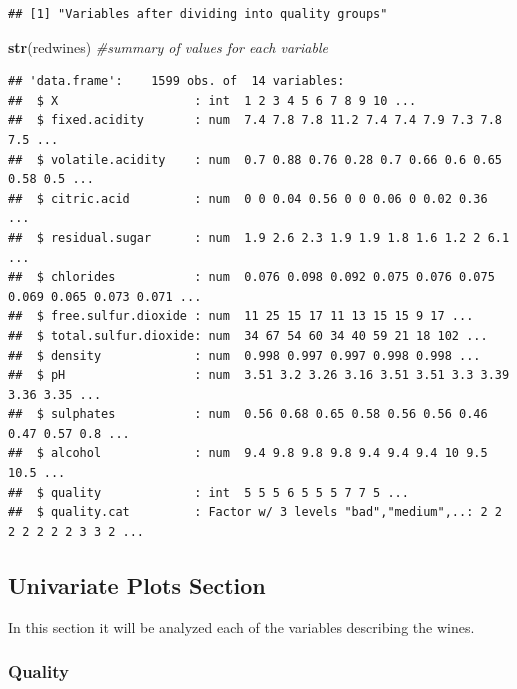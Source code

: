 \documentclass[]{article}
\newenvironment{Shaded}{\begin{snugshade}}{\end{snugshade}}
\newcommand{\KeywordTok}[1]{\textcolor[rgb]{0.13,0.29,0.53}{\textbf{{#1}}}}
\newcommand{\CommentTok}[1]{\textcolor[rgb]{0.56,0.35,0.01}{\textit{{#1}}}}
\newcommand{\NormalTok}[1]{{#1}}
\begin{document}
\begin{verbatim}
## [1] "Variables after dividing into quality groups"
\end{verbatim}

\begin{Shaded}
\begin{Highlighting}[]
\KeywordTok{str}\NormalTok{(redwines) }\CommentTok{#summary of values for each variable}
\end{Highlighting}
\end{Shaded}

\begin{verbatim}
## 'data.frame':    1599 obs. of  14 variables:
##  $ X                   : int  1 2 3 4 5 6 7 8 9 10 ...
##  $ fixed.acidity       : num  7.4 7.8 7.8 11.2 7.4 7.4 7.9 7.3 7.8 7.5 ...
##  $ volatile.acidity    : num  0.7 0.88 0.76 0.28 0.7 0.66 0.6 0.65 0.58 0.5 ...
##  $ citric.acid         : num  0 0 0.04 0.56 0 0 0.06 0 0.02 0.36 ...
##  $ residual.sugar      : num  1.9 2.6 2.3 1.9 1.9 1.8 1.6 1.2 2 6.1 ...
##  $ chlorides           : num  0.076 0.098 0.092 0.075 0.076 0.075 0.069 0.065 0.073 0.071 ...
##  $ free.sulfur.dioxide : num  11 25 15 17 11 13 15 15 9 17 ...
##  $ total.sulfur.dioxide: num  34 67 54 60 34 40 59 21 18 102 ...
##  $ density             : num  0.998 0.997 0.997 0.998 0.998 ...
##  $ pH                  : num  3.51 3.2 3.26 3.16 3.51 3.51 3.3 3.39 3.36 3.35 ...
##  $ sulphates           : num  0.56 0.68 0.65 0.58 0.56 0.56 0.46 0.47 0.57 0.8 ...
##  $ alcohol             : num  9.4 9.8 9.8 9.8 9.4 9.4 9.4 10 9.5 10.5 ...
##  $ quality             : int  5 5 5 6 5 5 5 7 7 5 ...
##  $ quality.cat         : Factor w/ 3 levels "bad","medium",..: 2 2 2 2 2 2 2 3 3 2 ...
\end{verbatim}

\begin{Shaded}
\end{Shaded}

\subsection{Univariate Plots Section}\label{univariate-plots-section}

In this section it will be analyzed each of the variables describing the
wines.

\subsubsection{Quality}\label{quality}
\end{document}
